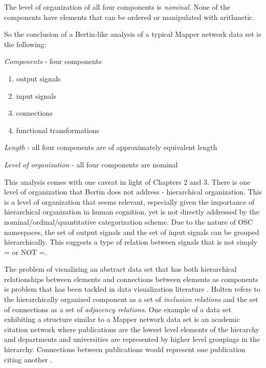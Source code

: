 The level of organization of all four components is \emph{nominal}. None of the components have elements that can be ordered or manipulated with arithmetic.

So the conclusion of a Bertin-like analysis of a typical Mapper network data set is the following:
\begin{description}
\item \emph{Components} - four components
    \begin{enumerate}
        \item output signals
        \item input signals
        \item connections
        \item functional transformations
    \end{enumerate}
\item \emph{Length} - all four components are of approximately equivalent length
\item \emph{Level of organization} - all four components are nominal
\end{description}

This analysis comes with one caveat in light of Chapters 2 and 3. There is one level of organization that Bertin does not address - hierarchical organization. This is a level of organization that seems relevant, especially given the importance of hierarchical organization in human cognition, yet is not directly addressed by the nominal/ordinal/quantitative categorization scheme. Due to the nature of OSC namespaces, the set of output signals and the set of input signals can be grouped hierarchically. This suggests a type of relation between signals that is not simply = or NOT =.

The problem of visualizing an abstract data set that has both hierarchical relationships between elements and connections between elements as components is problem that has been tackled in data visualization literature \cite{edgebundles2006}. Holten refers to the hierarchically organized component as a set of \emph{inclusion relations} and the set of connections as a set of \emph{adjacency relations}. One example of a data set exhibiting a structure similar to a Mapper network data set is an academic citation network where publications are the lowest level elements of the hierarchy and departments and universities are represented by higher level groupings in the hierarchy. Connections between publications would represent one publication citing another \cite{edgebundles2006}.

